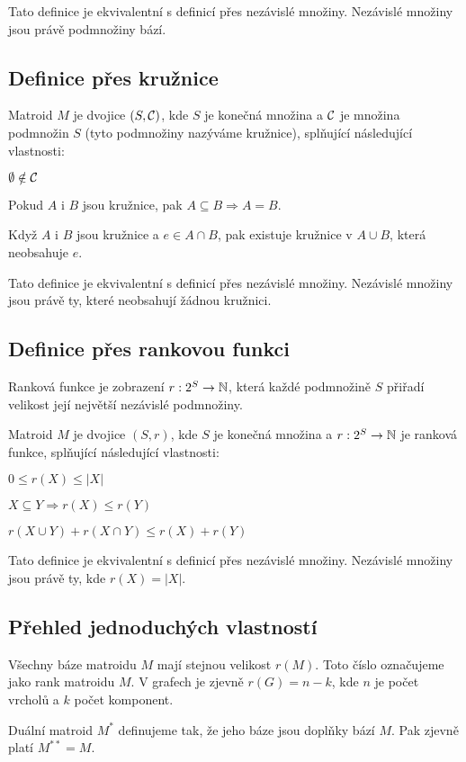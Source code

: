 \poz Tato definice je ekvivalentní s definicí přes nezávislé množiny. Nezávislé
množiny jsou právě podmnožiny bází.

\subsection{Definice přes kružnice}
\df Matroid $M$ je dvojice $(S,\mathcal{C})$, kde $S$ je konečná množina a $\mathcal{C}$ je
množina podmnožin $S$ (tyto podmnožiny nazýváme kružnice), splňující
následující vlastnosti: 
\begin{enumerate*}
\item $\emptyset \notin \mathcal{C}$
\item Pokud $A$ i $B$ jsou kružnice, pak $A\subseteq B \Rightarrow A = B$.
\item Když $A$ i $B$ jsou kružnice a $e\in A\cap B$, pak existuje kružnice v $A\cup B$, která neobsahuje $e$.
\end{enumerate*}

\poz Tato definice je ekvivalentní s definicí přes nezávislé množiny. Nezávislé
množiny jsou právě ty, které neobsahují žádnou kružnici.

\subsection{Definice přes rankovou funkci}
\df Ranková funkce je zobrazení $r: 2^S \rightarrow \mathbb{N}$, která každé podmnožině
$S$ přiřadí velikost její největší nezávislé podmnožiny.

\df Matroid $M$ je dvojice $(S,r)$, kde $S$ je konečná množina a $r: 2^S
\rightarrow \mathbb{N}$ je ranková funkce, splňující následující vlastnosti:
\begin{enumerate*}
\item $0 \le r(X) \le |X|$
\item $X\subseteq Y \Rightarrow r(X) \le r(Y)$
\item $r(X\cup Y) + r(X\cap Y) \le r(X) + r(Y)$
\end{enumerate*}

\poz Tato definice je ekvivalentní s definicí přes nezávislé množiny. Nezávislé množiny jsou právě ty, kde $r(X) = |X|$.

\subsection{Přehled jednoduchých vlastností}
\tv Všechny báze matroidu $M$ mají stejnou velikost $r(M)$. Toto číslo
označujeme jako rank matroidu $M$. V grafech je zjevně $r(G) = n-k$, kde $n$ je počet vrcholů a $k$ počet komponent.

\df Duální matroid $M^*$ definujeme tak, že jeho báze jsou doplňky bází $M$. Pak zjevně platí $M^{**} = M$.





